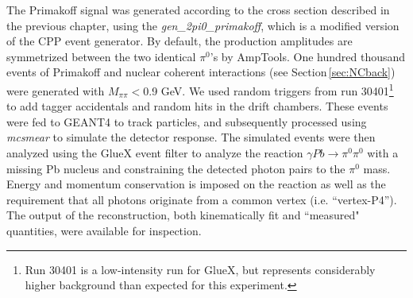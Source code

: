 The Primakoff signal was generated according to the cross section
described in the previous chapter, using the
\emph{gen\_2pi0\_primakoff}, which is a modified version of the CPP event generator. By default, the production amplitudes are
symmetrized between the two identical $\pi^0$'s by AmpTools. One
hundred thousand events of Primakoff and nuclear coherent interactions 
(see Section\,\ref{sec:NCback}) were generated with $M_{\pi\pi}<$0.9 GeV.
We used random triggers from run 30401\footnote{Run 30401 is a low-intensity run for GlueX,
but represents considerably higher background than expected for this experiment.} to add tagger accidentals 
and random hits in the drift chambers. These events were fed to GEANT4 to track particles, and subsequently
processed using \emph{mcsmear} to simulate the detector response. The
simulated events were then analyzed using the GlueX event filter to
analyze the reaction $\gamma Pb \rightarrow \pi^0 \pi^0$ with a
missing Pb nucleus and constraining the detected photon pairs to the
$\pi^0$ mass. Energy and momentum conservation is imposed on the reaction as well as the requirement that all photons originate from a common vertex (i.e. ``vertex-P4''). The output of the reconstruction, both kinematically
fit and ``measured" quantities, were available for inspection.

